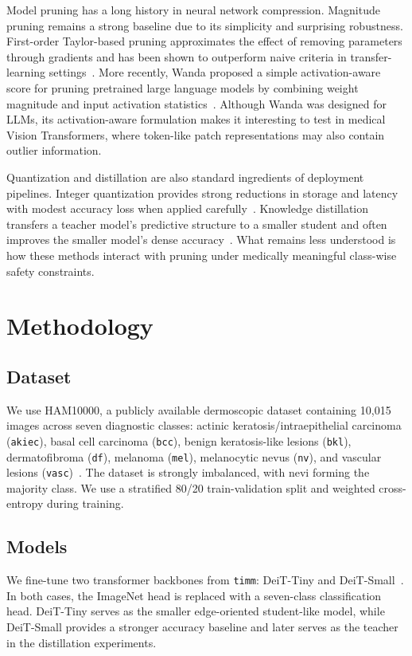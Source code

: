 \documentclass[11pt]{article}
\begin{document}
Model pruning has a long history in neural network compression. Magnitude pruning remains a strong baseline due to its simplicity and surprising robustness. First-order Taylor-based pruning approximates the effect of removing parameters through gradients and has been shown to outperform naive criteria in transfer-learning settings~\cite{molchanov2017taylor}. More recently, Wanda proposed a simple activation-aware score for pruning pretrained large language models by combining weight magnitude and input activation statistics~\cite{sun2023wanda}. Although Wanda was designed for LLMs, its activation-aware formulation makes it interesting to test in medical Vision Transformers, where token-like patch representations may also contain outlier information.

Quantization and distillation are also standard ingredients of deployment pipelines. Integer quantization provides strong reductions in storage and latency with modest accuracy loss when applied carefully~\cite{jacob2018quantization}. Knowledge distillation transfers a teacher model's predictive structure to a smaller student and often improves the smaller model's dense accuracy~\cite{hinton2015distillation}. What remains less understood is how these methods interact with pruning under medically meaningful class-wise safety constraints.

\section{Methodology}
\subsection{Dataset}
We use HAM10000, a publicly available dermoscopic dataset containing 10{,}015 images across seven diagnostic classes: actinic keratosis/intraepithelial carcinoma (\texttt{akiec}), basal cell carcinoma (\texttt{bcc}), benign keratosis-like lesions (\texttt{bkl}), dermatofibroma (\texttt{df}), melanoma (\texttt{mel}), melanocytic nevus (\texttt{nv}), and vascular lesions (\texttt{vasc})~\cite{tschandl2018ham10000}. The dataset is strongly imbalanced, with nevi forming the majority class. We use a stratified 80/20 train-validation split and weighted cross-entropy during training.

\subsection{Models}
We fine-tune two transformer backbones from \texttt{timm}: DeiT-Tiny and DeiT-Small~\cite{touvron2021deit}. In both cases, the ImageNet head is replaced with a seven-class classification head. DeiT-Tiny serves as the smaller edge-oriented student-like model, while DeiT-Small provides a stronger accuracy baseline and later serves as the teacher in the distillation experiments.
\end{document}
